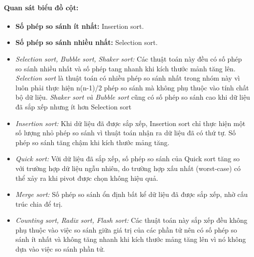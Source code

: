     \paragraph{Quan sát biểu đồ cột:}
    \begin{itemize}
        \item \textbf{Số phép so sánh ít nhất:} Insertion sort.
        \item \textbf{Số phép so sánh nhiều nhất:} Selection sort.
        \item \textit{Selection sort, Bubble sort, Shaker sort:} Các thuật toán này đều có số phép so sánh nhiều nhất và số phép tang nhanh khi kích thước mảnh tăng lên. \textit{Selection sort} là thuật toán có nhiều phép so sánh nhất trong nhóm này vì luôn phải thực hiện n(n-1)/2 phép so sánh mà không phụ thuộc vào tính chất bộ dữ liệu. \textit{Shaker sort và Bubble sort} cũng có số phép so sánh cao khi dữ liệu đã sắp xếp nhưng ít hơn Selection sort
        \item \textit{Insertion sort: }Khi dữ liệu đã được sắp xếp, Insertion sort chỉ thực hiện một số lượng nhỏ phép so sánh vì thuật toán nhận ra dữ liệu đã có thứ tự. Số phép so sánh tăng chậm khi kích thước mảng tăng.
        \item \textit{ Quick sort:} Với dữ liệu đã sắp xếp, số phép so sánh của Quick sort tăng so với trường hợp dữ liệu ngẫu nhiên, do trường hợp xấu nhất (worst-case) có thể xảy ra khi pivot được chọn không hiệu quả.
        \item \textit{Merge sort: }Số phép so sánh ổn định bất kể dữ liệu đã được sắp xếp, nhờ cấu trúc chia để trị.
        \item \textit{Counting sort, Radix sort, Flash sort:} Các thuật toán này sắp xếp đều không phụ thuộc vào việc so sánh giữa giá trị của các phần tử nên có số phép so sánh ít nhất và không tăng nhanh khi kích thước mảng tăng lên vì nó không dựa vào việc so sánh phần tử.
    \end{itemize}

\newpage
